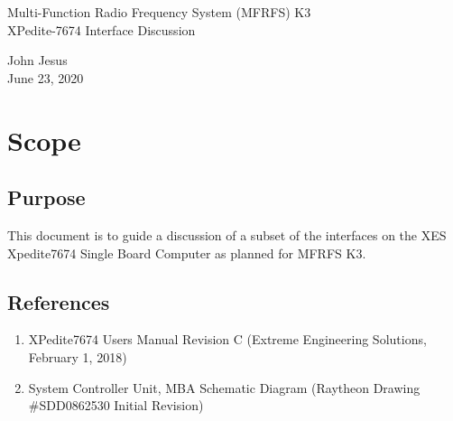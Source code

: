 \documentclass[12pt]{article}
\begin{document}
\thispagestyle{empty}
\begin{titlepage}
\begin{center}
        \vspace*{1cm}

        \LARGE{Multi-Function Radio Frequency System (MFRFS) K3 \\
            XPedite-7674 Interface Discussion}

        \vspace{0.5cm}
        \LARGE

        \vspace{1.5cm}

        \normalsize

        John Jesus \\
        June 23, 2020

        \vfill



        \vspace{0.8cm}




\end{center}
\end{titlepage}

\tableofcontents
\newpage

\section{Scope}
\subsection{Purpose}
This document is to guide a discussion of a subset of the interfaces on the XES Xpedite7674 Single Board Computer as planned for MFRFS K3.

\subsection{References}
\begin{enumerate}
    \item XPedite7674 Users Manual Revision C (Extreme Engineering Solutions, February 1, 2018)\label{ref:1}
    \item System Controller Unit, MBA Schematic Diagram (Raytheon Drawing \#SDD0862530 Initial Revision)\label{ref:2}
\end{enumerate}
\end{document}
